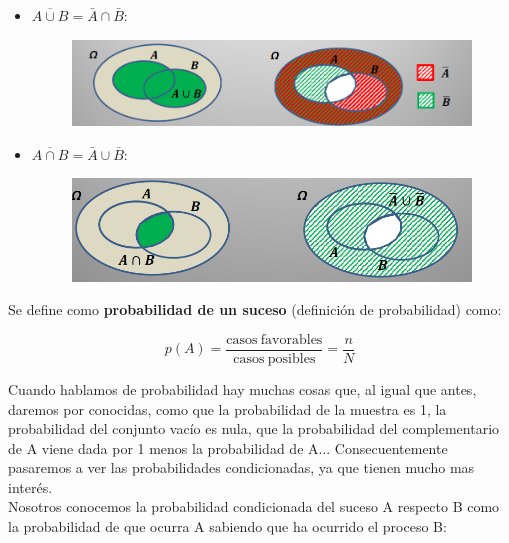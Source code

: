 \documentclass[12pt,a4paper]{book}
\begin{document}
\begin{itemize}

\item $ \overline{A \cup B} = \bar{A} \cap \bar{B}$:

\begin{figure}[h!] \centering
\includegraphics[scale=0.6]{primera-ley-morgan.png}
\end{figure}

\item $ \overline{A \cap B} = \bar{A} \cup \bar{B} $:


\begin{figure}[h!] \centering
\includegraphics[scale=0.7]{segunda-ley-morgan.png}
\end{figure}


\end{itemize}

Se define como \textbf{probabilidad de un suceso} (definición de probabilidad) como:

\begin{equation}
p(A) = \dfrac{\mathrm{casos \ favorables}}{\mathrm{casos \ posibles}} = \dfrac{n}{N}
\end{equation}

Cuando hablamos de probabilidad hay muchas cosas que, al igual que antes, daremos por conocidas, como que la probabilidad de la muestra es 1, la probabilidad del conjunto vacío es nula, que la probabilidad del complementario de A viene dada por 1 menos la probabilidad de A... Consecuentemente pasaremos a ver las probabilidades condicionadas, ya que tienen mucho mas interés. \\

Nosotros conocemos la probabilidad condicionada del suceso A respecto B como la probabilidad de que ocurra A sabiendo que ha ocurrido el proceso B:
\end{document}
